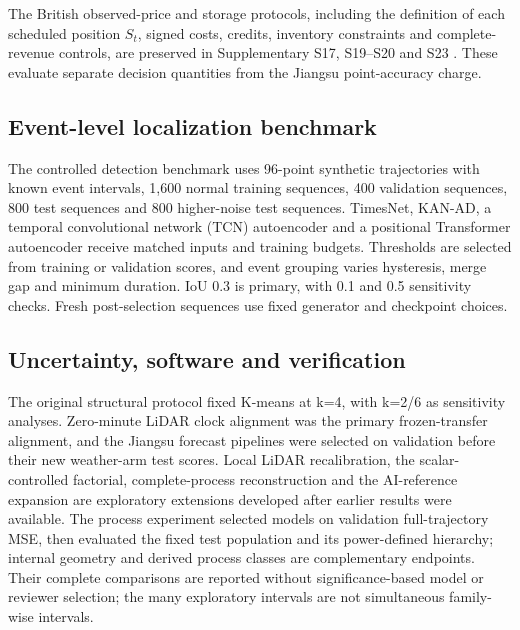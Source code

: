 \documentclass[preprint,12pt]{elsarticle}
\begin{document}
The British observed-price and storage protocols, including the definition of each scheduled position \(S_t\), signed costs, credits, inventory constraints and complete-revenue controls, are preserved in Supplementary S17, S19--S20 and S23 \citep{elexonsettlement, korpaas2003}. These evaluate separate decision quantities from the Jiangsu point-accuracy charge.

\subsection{Event-level localization benchmark}\label{event-level-localization-benchmark}

The controlled detection benchmark uses 96-point synthetic trajectories with known event intervals, 1,600 normal training sequences, 400 validation sequences, 800 test sequences and 800 higher-noise test sequences. TimesNet, KAN-AD, a temporal convolutional network (TCN) autoencoder and a positional Transformer autoencoder receive matched inputs and training budgets. Thresholds are selected from training or validation scores, and event grouping varies hysteresis, merge gap and minimum duration. IoU 0.3 is primary, with 0.1 and 0.5 sensitivity checks. Fresh post-selection sequences use fixed generator and checkpoint choices.

\subsection{Uncertainty, software and verification}\label{uncertainty-software-and-verification}

The original structural protocol fixed K-means at k=4, with k=2/6 as sensitivity analyses. Zero-minute LiDAR clock alignment was the primary frozen-transfer alignment, and the Jiangsu forecast pipelines were selected on validation before their new weather-arm test scores. Local LiDAR recalibration, the scalar-controlled factorial, complete-process reconstruction and the AI-reference expansion are exploratory extensions developed after earlier results were available. The process experiment selected models on validation full-trajectory MSE, then evaluated the fixed test population and its power-defined hierarchy; internal geometry and derived process classes are complementary endpoints. Their complete comparisons are reported without significance-based model or reviewer selection; the many exploratory intervals are not simultaneous family-wise intervals.
\end{document}
